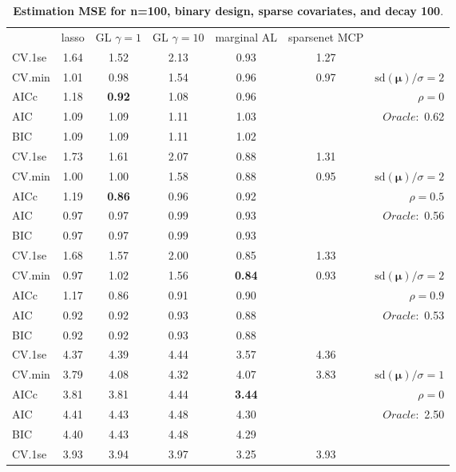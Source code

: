 \clearpage
\begin{table}\vspace{-.5cm}
\caption[l]{ { \bf Estimation MSE for n=100, binary design, 
sparse covariates, and  decay  100}.}
\vspace{-.5cm}
\footnotesize{}
\begin{center}
\begin{tabular}{l*{5}{c}|r}
& lasso & GL $\gamma=1$ & GL $\gamma=10$ & marginal AL & sparsenet MCP  & \\
 \cline{1-7}
CV.1se & 1.64 & 1.52 & 2.13 & 0.93 & 1.27 & \\
CV.min & 1.01 & 0.98 & 1.54 & 0.96 & 0.97 &  $\mathrm{sd}(\mathbf{\mu})/\sigma=2$ \\
AICc & 1.18 & {\bf 0.92} & 1.08 & 0.96 & & $\rho=0$ \\
AIC & 1.09 & 1.09 & 1.11 & 1.03 & &  \multirow{2}{*}{$Oracle: $ 0.62} \\
BIC & 1.09 & 1.09 & 1.11 & 1.02 & &  \\
 \hline 
CV.1se & 1.73 & 1.61 & 2.07 & 0.88 & 1.31 & \\
CV.min & 1.00 & 1.00 & 1.58 & 0.88 & 0.95 &  $\mathrm{sd}(\mathbf{\mu})/\sigma=2$ \\
AICc & 1.19 & {\bf 0.86} & 0.96 & 0.92 & & $\rho=0.5$ \\
AIC & 0.97 & 0.97 & 0.99 & 0.93 & &  \multirow{2}{*}{$Oracle: $ 0.56} \\
BIC & 0.97 & 0.97 & 0.99 & 0.93 & &  \\
 \hline 
CV.1se & 1.68 & 1.57 & 2.00 & 0.85 & 1.33 & \\
CV.min & 0.97 & 1.02 & 1.56 & {\bf 0.84} & 0.93 &  $\mathrm{sd}(\mathbf{\mu})/\sigma=2$ \\
AICc & 1.17 & 0.86 & 0.91 & 0.90 & & $\rho=0.9$ \\
AIC & 0.92 & 0.92 & 0.93 & 0.88 & &  \multirow{2}{*}{$Oracle: $ 0.53} \\
BIC & 0.92 & 0.92 & 0.93 & 0.88 & &  \\
 \hline 
CV.1se & 4.37 & 4.39 & 4.44 & 3.57 & 4.36 & \\
CV.min & 3.79 & 4.08 & 4.32 & 4.07 & 3.83 &  $\mathrm{sd}(\mathbf{\mu})/\sigma=1$ \\
AICc & 3.81 & 3.81 & 4.44 & {\bf 3.44} & & $\rho=0$ \\
AIC & 4.41 & 4.43 & 4.48 & 4.30 & &  \multirow{2}{*}{$Oracle: $ 2.50} \\
BIC & 4.40 & 4.43 & 4.48 & 4.29 & &  \\
 \hline 
CV.1se & 3.93 & 3.94 & 3.97 & 3.25 & 3.93 & \\

\end{tabular}
\end{center}
\end{table}
